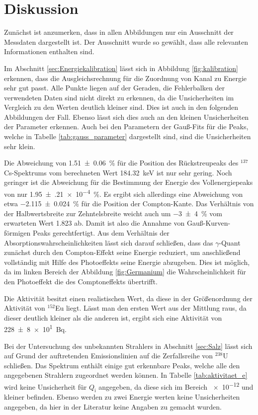 \section{Diskussion}
\label{sec:Diskussion}
Zunächst ist anzumerken, dass in allen Abbildungen nur ein Ausschnitt
der Messdaten dargestellt ist. Der Ausschnitt wurde so gewählt, dass alle
relevanten Informationen enthalten sind.

Im Abschnitt \ref{sec:Energiekalibration} lässt sich in Abbildung \ref{fig:kalibration}
erkennen, dass die Ausgleichsrechnung für die Zuordnung von Kanal zu Energie
sehr gut passt. Alle Punkte liegen auf der Geraden, die Fehlerbalken der
verwendeten Daten sind nicht direkt zu erkennen, da die Unsicherheiten im Vergleich zu
den Werten deutlich kleiner sind. Dies ist auch in den folgenden Abbildungen
der Fall. Ebenso lässt sich dies auch an den kleinen Unsicherheiten der Parameter erkennen.
Auch bei den Parametern der Gauß-Fits für die Peaks, welche in Tabelle
\ref{tab:gauss_parameter} dargestellt sind, sind die Unsicherheiten sehr klein.

Die Abweichung von \SI{1.51(6)}{\percent} für die
Position des Rückstreupeaks des ${}^{137}$Cs-Spektrums vom
berechneten Wert \SI{184.32}{\kilo\electronvolt} ist nur sehr gering. Noch
geringer ist die Abweichung für die Bestimmung der Energie des Vollenergiepeaks
von nur \SI{1.95(21)e-4}{\percent}. Es ergibt sich allerdings eine
Abweichung von etwa \SI{-2.115(24)}{\percent} für die Position
der Compton-Kante.
Das Verhältnis von der Halbwertsbreite zur Zehntelsbreite weicht auch 
um \SI{-3(4)}{\percent} vom erwarteten Wert \num{1.823} ab. Damit ist
also die Annahme von Gauß-Kurven-förmigen Peaks gerechtfertigt.
Aus dem Verhältnis der Absorptionswahrscheinlichkeiten lässt sich darauf schließen,
dass das $\gamma$-Quant zunächst durch den Compton-Effekt seine Energie reduziert,
um anschließend vollständig mit Hilfe des Photoeffekts seine Energie abzugeben.
Dies ist möglich, da im linken Bereich der Abbildung \ref{fig:Germanium}
die Wahrscheinlichkeit für den Photoeffekt die des Comptoneffekts
übertrifft.

Die Aktivität besitzt einen realistischen Wert, da diese in der Größenordnung der Aktivität von
${}^{152}$Eu liegt. Lässt man den ersten Wert aus der Mittlung raus, da dieser deutlich
kleiner als die anderen ist, ergibt sich eine Aktivität von \SI{228(8)e1}{\becquerel}.

Bei der Untersuchung des unbekannten Strahlers in Abschnitt \ref{sec:Salz}
lässt sich auf Grund der auftretenden Emissionslinien auf die Zerfallsreihe
von ${}^{238}$U schließen. Das Spektrum enthält einige gut erkennbare
Peaks, welche alle den angegebenen Strahlern zugeordnet werden können.
In Tabelle \ref{tab:aktivitaet_e} wird keine Unsicherheit für $Q_\text{i}$
angegeben, da diese sich im Bereich \num{e-12} und kleiner befinden.
Ebenso werden zu zwei Energie werten keine Unsicherheiten angegeben, da
hier in der Literatur keine Angaben zu gemacht wurden.